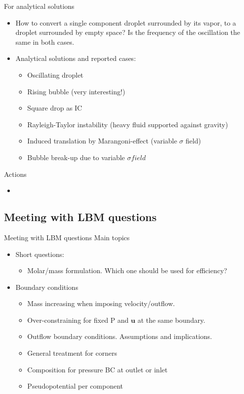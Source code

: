 \documentclass{beamer}
\begin{document}
	\begin{frame}{For analytical solutions}
		\begin{itemize}
			\item How to convert a single component droplet surrounded by its vapor, to a droplet surrounded by empty space? Is the frequency of the oscillation the same in both cases.
			
			\item Analytical solutions and reported cases:
			\begin{itemize}
				\item Oscillating droplet
				\item Rising bubble (very interesting!)
				\item Square drop as IC
				\item Rayleigh-Taylor instability (heavy fluid supported against gravity)
				\item Induced translation by Marangoni-effect (variable $\sigma$ field)
				\item Bubble break-up due to variable $\sigma field$
			\end{itemize}
		\end{itemize}
	\end{frame}

	\begin{frame}{Actions}
		\begin{itemize}
			\item
		\end{itemize}
	\end{frame}
	
	
	\subsection{Meeting with LBM questions}
	\label{}
	\justifying
	\begin{frame}{Meeting with LBM questions}
		Main topics
		\begin{itemize}
			\item Short questions:
			\begin{itemize}
				\item Molar/mass formulation. Which one should be used for efficiency? 
			\end{itemize}
			\item Boundary conditions
			\begin{itemize}
				\item Mass increasing when imposing velocity/outflow.
				\item Over-constraining for fixed P and $\mathbf{u}$ at the same boundary.
				\item Outflow boundary conditions. Assumptions and implications.
				\item General treatment for corners 
				\item Composition for pressure BC at outlet or inlet
				\item Pseudopotential per component
			\end{itemize}
		\end{itemize}
	\end{frame}
	
\end{document}
